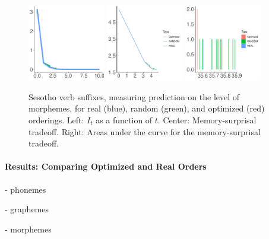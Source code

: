 \begin{figure}
	\begin{center}
\includegraphics[width=0.3\textwidth]{figures/Sesotho-suffixes-byMorphemes-it.pdf}
\includegraphics[width=0.3\textwidth]{figures/Sesotho-suffixes-byMorphemes-memsurp.pdf}
\includegraphics[width=0.3\textwidth]{figures/Sesotho-suffixes-byMorphemes-auc.pdf}
\end{center}
	\caption{Sesotho verb suffixes, measuring prediction on the level of morphemes, for real (blue), random (green), and optimized (red) orderings. Left: $I_t$ as a function of $t$. Center: Memory-surprisal tradeoff. Right: Areas under the curve for the memory-surprisal tradeoff.}\label{fig:jap-morph}
\end{figure}


\paragraph{Results: Comparing Optimized and Real Orders}

- phonemes

- graphemes

- morphemes

